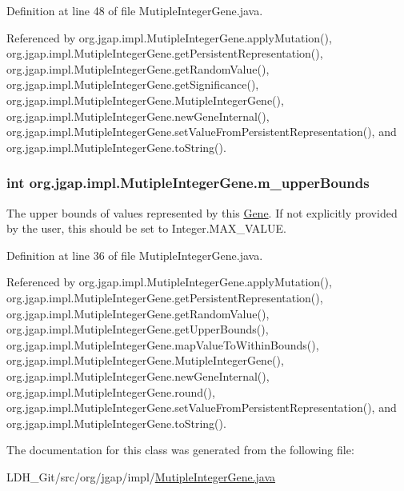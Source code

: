 Definition at line 48 of file Mutiple\-Integer\-Gene.\-java.



Referenced by org.\-jgap.\-impl.\-Mutiple\-Integer\-Gene.\-apply\-Mutation(), org.\-jgap.\-impl.\-Mutiple\-Integer\-Gene.\-get\-Persistent\-Representation(), org.\-jgap.\-impl.\-Mutiple\-Integer\-Gene.\-get\-Random\-Value(), org.\-jgap.\-impl.\-Mutiple\-Integer\-Gene.\-get\-Significance(), org.\-jgap.\-impl.\-Mutiple\-Integer\-Gene.\-Mutiple\-Integer\-Gene(), org.\-jgap.\-impl.\-Mutiple\-Integer\-Gene.\-new\-Gene\-Internal(), org.\-jgap.\-impl.\-Mutiple\-Integer\-Gene.\-set\-Value\-From\-Persistent\-Representation(), and org.\-jgap.\-impl.\-Mutiple\-Integer\-Gene.\-to\-String().

\hypertarget{classorg_1_1jgap_1_1impl_1_1_mutiple_integer_gene_a7bd98488d96667540c92755045ad9460}{
\subsubsection[{m\-\_\-upper\-Bounds}]{\setlength{\rightskip}{0pt plus 5cm}int org.\-jgap.\-impl.\-Mutiple\-Integer\-Gene.\-m\-\_\-upper\-Bounds\hspace{0.3cm}{\ttfamily [private]}}}\label{classorg_1_1jgap_1_1impl_1_1_mutiple_integer_gene_a7bd98488d96667540c92755045ad9460}
The upper bounds of values represented by this \hyperlink{interfaceorg_1_1jgap_1_1_gene}{Gene}. If not explicitly provided by the user, this should be set to Integer.\-M\-A\-X\-\_\-\-V\-A\-L\-U\-E. 

Definition at line 36 of file Mutiple\-Integer\-Gene.\-java.



Referenced by org.\-jgap.\-impl.\-Mutiple\-Integer\-Gene.\-apply\-Mutation(), org.\-jgap.\-impl.\-Mutiple\-Integer\-Gene.\-get\-Persistent\-Representation(), org.\-jgap.\-impl.\-Mutiple\-Integer\-Gene.\-get\-Random\-Value(), org.\-jgap.\-impl.\-Mutiple\-Integer\-Gene.\-get\-Upper\-Bounds(), org.\-jgap.\-impl.\-Mutiple\-Integer\-Gene.\-map\-Value\-To\-Within\-Bounds(), org.\-jgap.\-impl.\-Mutiple\-Integer\-Gene.\-Mutiple\-Integer\-Gene(), org.\-jgap.\-impl.\-Mutiple\-Integer\-Gene.\-new\-Gene\-Internal(), org.\-jgap.\-impl.\-Mutiple\-Integer\-Gene.\-round(), org.\-jgap.\-impl.\-Mutiple\-Integer\-Gene.\-set\-Value\-From\-Persistent\-Representation(), and org.\-jgap.\-impl.\-Mutiple\-Integer\-Gene.\-to\-String().



The documentation for this class was generated from the following file\-:\begin{DoxyCompactItemize}
\item 
L\-D\-H\-\_\-\-Git/src/org/jgap/impl/\hyperlink{_mutiple_integer_gene_8java}{Mutiple\-Integer\-Gene.\-java}\end{DoxyCompactItemize}
